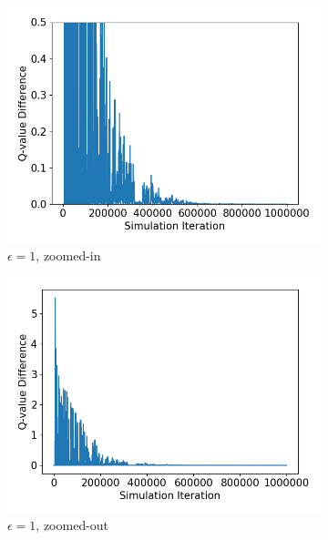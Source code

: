 \documentclass[10pt]{article}
\begin{document}
\begin{figure}[H]
  \centering
  \begin{subfigure}[b]{0.245\linewidth}
  \centering
  \includegraphics[width=\linewidth]{../figs/ceQ_09_1_1_1000000_replot.png}
      \caption{$\epsilon=1$, zoomed-in}
  \label{fig:ceQ_1_cut}
  \end{subfigure}
  \begin{subfigure}[b]{0.245\linewidth}
  \centering
  \includegraphics[width=\linewidth]{../figs/ceQ_09_1_1_1000000.png}
      \caption{$\epsilon=1$, zoomed-out}
  \label{fig:ceQ_1_uncut}
  \end{subfigure}
   \begin{subfigure}[b]{0.245\linewidth}

\end{subfigure}
\end{figure}
\end{document}
